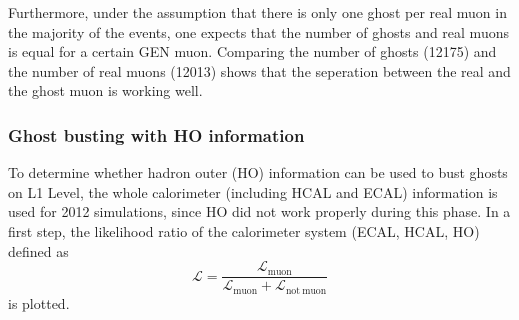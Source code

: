Furthermore, under the assumption that there is only one ghost per real muon in the majority of the events, one expects that the number of ghosts and real muons is equal for a certain GEN muon. Comparing the number of ghosts (12175) and the number of real muons (12013) shows that the seperation between the real and the ghost muon is working well.

\subsubsection{Ghost busting with HO information}
To determine whether hadron outer (HO) information can be used to bust ghosts on L1 Level, the whole calorimeter (including HCAL and ECAL) information is used for 2012 simulations, since HO did not work properly during this phase. In a first step, the likelihood ratio of the calorimeter system (ECAL, HCAL, HO) defined as
\begin{equation}
\mathcal{L}=\frac{\mathcal{L}_{\mathrm{muon}}}{\mathcal{L}_{\mathrm{muon}} + \mathcal{L}_\mathrm{not\ muon}}
\end{equation}
is plotted.
